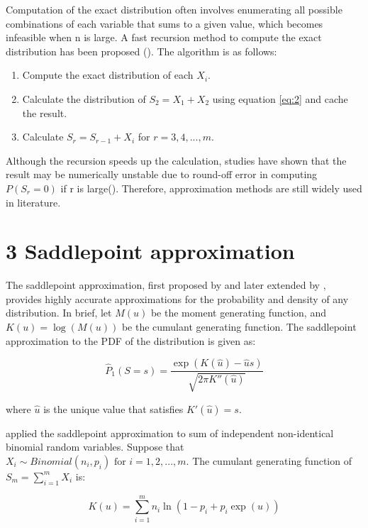 Computation of the exact distribution often involves enumerating all possible combinations of each variable that sums to a given value, which becomes infeasible when n is large. A fast recursion method to compute the exact distribution has been proposed (\cite{Butler:2016cj,ArthurWoodward:1997en}). The algorithm is as follows: 

\begin{enumerate}
	\item Compute the exact distribution of each $X_i$.
	\item Calculate the distribution of $S_2=X_1+X_2$ using equation \ref{eq:2} and cache the result. 
	\item Calculate $S_r = S_{r-1} + X_i$ for $r = 3,4,...,m$.
\end{enumerate}

Although the recursion speeds up the calculation, studies have shown that the result may be numerically unstable due to round-off error in computing $P(S_r=0)$ if r is large(\cite{Yili:al1vGrvv,Eisinga:2013da}). Therefore, approximation methods are still widely used in literature.  

\section{3 Saddlepoint approximation}

The saddlepoint approximation, first proposed by \cite{Daniels:1954hy} and later extended by \cite{Lugannani:1980jm}, provides highly accurate approximations for the probability and density of any distribution. In brief, let $M(u)$ be the moment generating function, and $K(u) = \log(M(u))$ be the cumulant generating function. The saddlepoint approximation to the PDF of the distribution is given as: 

\begin{equation}
\hat{P}_1(S=s)=\frac{\exp(K(\hat{u}) - \hat{u} s)}{\sqrt{2 \pi K''(\hat{u})}}
\end{equation}

where $\hat{u}$ is the unique value that satisfies $K'(\hat{u})=s$. 


 \citet{Eisinga:2013da} applied the saddlepoint approximation to sum of independent non-identical binomial random variables. Suppose that $X_i \sim Binomial(n_i, p_i) \text{ for } i = 1,2,...,m$. The cumulant generating function of $S_m = \sum_{i=1}^m X_i$ is:

\begin{equation}
K(u) = \sum_{i=1}^m n_i \ln (1-p_i + p_i \exp(u))
\end{equation}


